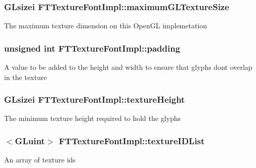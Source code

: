 \subsubsection[{\texorpdfstring{maximum\+G\+L\+Texture\+Size}{maximumGLTextureSize}}]{\setlength{\rightskip}{0pt plus 5cm}G\+Lsizei F\+T\+Texture\+Font\+Impl\+::maximum\+G\+L\+Texture\+Size\hspace{0.3cm}{\ttfamily [private]}}\hypertarget{class_f_t_texture_font_impl_a4c7ad20df5b4a840d8f0276ac0935544}{}\label{class_f_t_texture_font_impl_a4c7ad20df5b4a840d8f0276ac0935544}
The maximum texture dimension on this Open\+GL implemetation 
\subsubsection[{\texorpdfstring{padding}{padding}}]{\setlength{\rightskip}{0pt plus 5cm}unsigned int F\+T\+Texture\+Font\+Impl\+::padding\hspace{0.3cm}{\ttfamily [private]}}\hypertarget{class_f_t_texture_font_impl_ab8b4d2241f395e2abe0c287b40ab5726}{}\label{class_f_t_texture_font_impl_ab8b4d2241f395e2abe0c287b40ab5726}
A value to be added to the height and width to ensure that glyphs don\textquotesingle{}t overlap in the texture 
\subsubsection[{\texorpdfstring{texture\+Height}{textureHeight}}]{\setlength{\rightskip}{0pt plus 5cm}G\+Lsizei F\+T\+Texture\+Font\+Impl\+::texture\+Height\hspace{0.3cm}{\ttfamily [private]}}\hypertarget{class_f_t_texture_font_impl_a05a16bd4c554cfc6623d9129a7bfe70e}{}\label{class_f_t_texture_font_impl_a05a16bd4c554cfc6623d9129a7bfe70e}
The minimum texture height required to hold the glyphs 
\subsubsection[{\texorpdfstring{texture\+I\+D\+List}{textureIDList}}]{$<$G\+Luint$>$ F\+T\+Texture\+Font\+Impl\+::texture\+I\+D\+List\hspace{0.3cm}{\ttfamily [private]}}\hypertarget{class_f_t_texture_font_impl_a79903b5dd7fefd31ba092f3d32bdffc1}{}\label{class_f_t_texture_font_impl_a79903b5dd7fefd31ba092f3d32bdffc1}
An array of texture ids 
